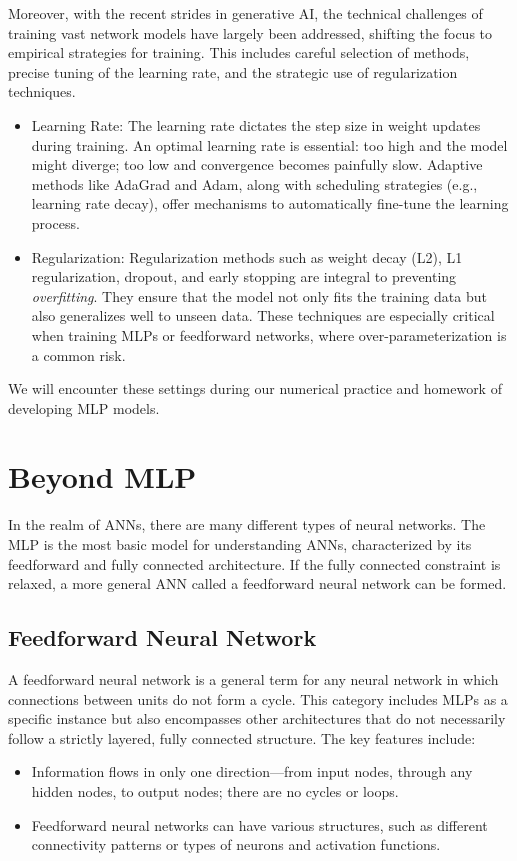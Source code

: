 \documentclass[12pt]{article}
\begin{document}
Moreover, with the recent strides in generative AI, the technical challenges of training vast network models have largely been addressed, shifting the focus to empirical strategies for training. This includes careful selection of methods, precise tuning of the learning rate, and the strategic use of regularization techniques.
\begin{itemize}

    \item Learning Rate: The learning rate dictates the step size in weight updates during training. An optimal learning rate is essential: too high and the model might diverge; too low and convergence becomes painfully slow. Adaptive methods like AdaGrad and Adam, along with scheduling strategies (e.g., learning rate decay), offer mechanisms to automatically fine-tune the learning process.

    \item Regularization: Regularization methods such as weight decay (L2), L1 regularization, dropout, and early stopping are integral to preventing \textit{overfitting}. They ensure that the model not only fits the training data but also generalizes well to unseen data. These techniques are especially critical when training MLPs or feedforward networks, where over-parameterization is a common risk.
\end{itemize}

We will encounter these settings during our numerical practice and homework of developing MLP models. 

\section{Beyond MLP}
In the realm of ANNs, there are many different types of neural networks. The MLP is the most basic model for understanding ANNs, characterized by its feedforward and fully connected architecture. If the fully connected constraint is relaxed, a more general ANN called a feedforward neural network can be formed.

\subsection{Feedforward Neural Network}
A feedforward neural network is a general term for any neural network in which connections between units do not form a cycle. This category includes MLPs as a specific instance but also encompasses other architectures that do not necessarily follow a strictly layered, fully connected structure. The key features include:
\begin{itemize}
    \item Information flows in only one direction---from input nodes, through any hidden nodes, to output nodes; there are no cycles or loops.
    \item Feedforward neural networks can have various structures, such as different connectivity patterns or types of neurons and activation functions.
\end{itemize}
\end{document}
